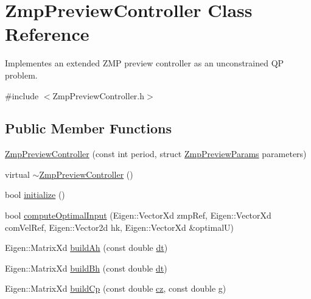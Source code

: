 \hypertarget{classZmpPreviewController}{}\section{Zmp\+Preview\+Controller Class Reference}
\label{classZmpPreviewController}


Implementes an extended Z\+MP preview controller as an unconstrained QP problem.  




{\ttfamily \#include $<$Zmp\+Preview\+Controller.\+h$>$}

\subsection*{Public Member Functions}
\begin{DoxyCompactItemize}
\item 
\hyperlink{classZmpPreviewController_af1c464b13886dc0edf2f295fc215b13c}{Zmp\+Preview\+Controller} (const int period, struct \hyperlink{structZmpPreviewParams}{Zmp\+Preview\+Params} parameters)
\item 
virtual \hyperlink{classZmpPreviewController_af702c45f318c7a78310d19cc061886dd}{$\sim$\+Zmp\+Preview\+Controller} ()
\item 
bool \hyperlink{classZmpPreviewController_ac28287e01187bff2cea5a68292d936bd}{initialize} ()
\item 
bool \hyperlink{classZmpPreviewController_a6e60eaa9ec24031a4acd10c9433a7bd0}{compute\+Optimal\+Input} (Eigen\+::\+Vector\+Xd zmp\+Ref, Eigen\+::\+Vector\+Xd com\+Vel\+Ref, Eigen\+::\+Vector2d hk, Eigen\+::\+Vector\+Xd \&optimalU)
\item 
Eigen\+::\+Matrix\+Xd \hyperlink{classZmpPreviewController_a39ffdba07960f90a6cce247065f12504}{build\+Ah} (const double \hyperlink{classZmpPreviewController_abf1a3ec8d1698afab1c20bba32b5a724}{dt})
\item 
Eigen\+::\+Matrix\+Xd \hyperlink{classZmpPreviewController_a0114a8bdba920b9a7fb6b35e7b90ddd1}{build\+Bh} (const double \hyperlink{classZmpPreviewController_abf1a3ec8d1698afab1c20bba32b5a724}{dt})
\item 
Eigen\+::\+Matrix\+Xd \hyperlink{classZmpPreviewController_a716fdc040e5eaf9f6fe00c652f205d73}{build\+Cp} (const double \hyperlink{classZmpPreviewController_a3a317d26cc1bbaf8811491724fdd1def}{cz}, const double \hyperlink{classZmpPreviewController_a344571f012aa58250d7625905681bf1b}{g})
\item 

\end{DoxyCompactItemize}

